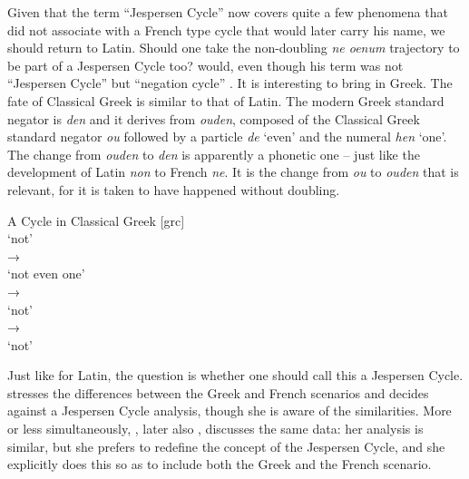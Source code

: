 ﻿\documentclass[output=paper]{langsci/langscibook}
\begin{document}
Given that the term ``Jespersen Cycle'' now covers quite a few phenomena
that \textcite{Jespersen1917} did not associate with a French type cycle
that would later carry his name, we should return to Latin. Should one
take the non-doubling \textit{ne oenum} trajectory to be part of
a Jespersen Cycle too? \textcites{Schwegler1983}{Schwegler1988} would, even though his term
was not ``Jespersen Cycle'' but ``negation cycle'' \parencite[cp. also]
[180]{Gianollo2018a}. It is interesting to bring in Greek. The
fate of Classical Greek is similar to that of Latin. The modern Greek
standard negator is \textit{den} and it derives from \textit{ouden},
composed of the Classical Greek standard negator \textit{ou} followed by
a particle \textit{de} `even' and the numeral \textit{hen} `one'. The
change from \textit{ouden} to \textit{den} is apparently a phonetic one
\parencite[303]{Willmott2013} -- just like the development of Latin
\textit{non} to French \textit{ne}. It is the change from \textit{ou} to
\textit{ouden} that is relevant, for it is taken to have happened without
doubling.
%
\begin{exe}\ex\label{ex:int-a-cycle-in-greek}
A Cycle in Classical Greek [grc]\\[1ex]
     `not'\\
→\\
  `not even one'\\
→\\
  `not'\\
→\\
      `not'
    \end{exe}
%
Just like for Latin, the question is whether one should call this a
Jespersen Cycle. \textcite{Willmott2013} stresses the differences between the
Greek and French scenarios and decides against a Jespersen Cycle analysis,
though she is aware of the similarities. More or less simultaneously,
\textcite{Chatzopoulou2012}, later also
\textcites{Chatzopoulou2015}{Chatzopoulou2019}, discusses
the same data: her analysis is similar, but she prefers to redefine the
concept of the Jespersen Cycle, and she explicitly does this so as to
include both the Greek and the French scenario. 
\end{document}
